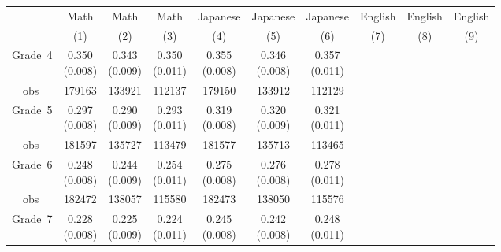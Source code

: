 \begin{tabular}{lccccccccc}
\hline \hline
 & Math & Math & Math & Japanese & Japanese & Japanese & English & English & English \\
 & (1) & (2) & (3) & (4) & (5) & (6) & (7) & (8) & (9) \\
\hline
Grade~4 & \makecell[tc]{0.350\\(0.008)} & \makecell[tc]{0.343\\(0.009)} & \makecell[tc]{0.350\\(0.011)} & \makecell[tc]{0.355\\(0.008)} & \makecell[tc]{0.346\\(0.008)} & \makecell[tc]{0.357\\(0.011)} &  &  &  \\
~~obs & 179163 & 133921 & 112137 & 179150 & 133912 & 112129 &  &  &  \\
Grade~5 & \makecell[tc]{0.297\\(0.008)} & \makecell[tc]{0.290\\(0.009)} & \makecell[tc]{0.293\\(0.011)} & \makecell[tc]{0.319\\(0.008)} & \makecell[tc]{0.320\\(0.009)} & \makecell[tc]{0.321\\(0.011)} &  &  &  \\
~~obs & 181597 & 135727 & 113479 & 181577 & 135713 & 113465 &  &  &  \\
Grade~6 & \makecell[tc]{0.248\\(0.008)} & \makecell[tc]{0.244\\(0.009)} & \makecell[tc]{0.254\\(0.011)} & \makecell[tc]{0.275\\(0.008)} & \makecell[tc]{0.276\\(0.008)} & \makecell[tc]{0.278\\(0.011)} &  &  &  \\
~~obs & 182472 & 138057 & 115580 & 182473 & 138050 & 115576 &  &  &  \\
Grade~7 & \makecell[tc]{0.228\\(0.008)} & \makecell[tc]{0.225\\(0.009)} & \makecell[tc]{0.224\\(0.011)} & \makecell[tc]{0.245\\(0.008)} & \makecell[tc]{0.242\\(0.008)} & \makecell[tc]{0.248\\(0.011)} &  &  &  \\

\end{tabular}
